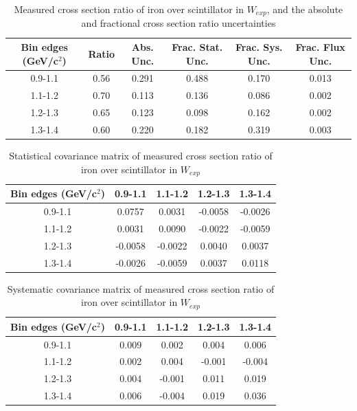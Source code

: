 \documentclass[../main.tex]{subfiles}
\begin{document}
\begin{table}
  \centering
  \renewcommand{\arraystretch}{1.15}
  \caption{Measured cross section ratio of iron over scintillator in $W_{exp}$, and the absolute and fractional cross section ratio uncertainties}
    \begin{tabular}{c||c|c||c|c|c}
      Bin edges (GeV/c${}^2$) &  Ratio  &  Abs. Unc.  &  Frac. Stat. Unc.  &  Frac. Sys. Unc.  &  Frac. Flux Unc. \\
      \hline
      \hline
      0.9-1.1 & 0.56 & 0.291 & 0.488 & 0.170 & 0.013\\
      1.1-1.2 & 0.70 & 0.113 & 0.136 & 0.086 & 0.002\\
      1.2-1.3 & 0.65 & 0.123 & 0.098 & 0.162 & 0.002\\
      1.3-1.4 & 0.60 & 0.220 & 0.182 & 0.319 & 0.003
    \end{tabular}
  \label{tbl:rationucleonnuc26Wa}
\end{table}
\begin{table}
  \centering
  \renewcommand{\arraystretch}{1.15}
  \caption{Statistical covariance matrix of measured cross section ratio of iron over scintillator in $W_{exp}$}
    \begin{tabular}{c||cccc}
      Bin edges (GeV/c${}^2$) & 0.9-1.1 & 1.1-1.2 & 1.2-1.3 & 1.3-1.4\\
      \hline
      \hline
      0.9-1.1 & 0.0757 & 0.0031 & -0.0058 & -0.0026\\
      1.1-1.2 & 0.0031 & 0.0090 & -0.0022 & -0.0059\\
      1.2-1.3 & -0.0058 & -0.0022 & 0.0040 & 0.0037\\
      1.3-1.4 & -0.0026 & -0.0059 & 0.0037 & 0.0118
    \end{tabular}
  \label{tbl:rationucleonnuc26Wb}
\end{table}
\begin{table}
  \centering
  \renewcommand{\arraystretch}{1.15}
  \caption{Systematic covariance matrix of measured cross section ratio of iron over scintillator in $W_{exp}$}
    \begin{tabular}{c||cccc}
      Bin edges (GeV/c${}^2$) & 0.9-1.1 & 1.1-1.2 & 1.2-1.3 & 1.3-1.4\\
      \hline
      \hline
      0.9-1.1 & 0.009 & 0.002 & 0.004 & 0.006\\
      1.1-1.2 & 0.002 & 0.004 & -0.001 & -0.004\\
      1.2-1.3 & 0.004 & -0.001 & 0.011 & 0.019\\
      1.3-1.4 & 0.006 & -0.004 & 0.019 & 0.036
    \end{tabular}
  \label{tbl:rationucleonnuc26Wc}
\end{table}
\end{document}
